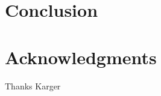\documentclass{style}
\begin{document}
\section{Conclusion}


\section{Acknowledgments}
Thanks Karger

%

%
%
\end{document}
